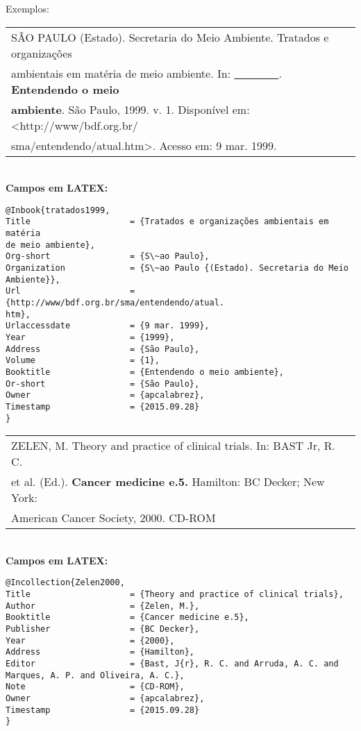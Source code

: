 	   	Exemplos: \\ 
	   	
	   	\begin{tabular}{|l|c|} \hline
	   		SÃO PAULO (Estado). Secretaria do Meio Ambiente. Tratados e organizações\\ ambientais em matéria de meio ambiente. In: \underline{\ \ \ \ \ \ \ \ }. \textbf{Entendendo o meio} \\\textbf{ambiente}. São Paulo, 1999. v. 1. Disponível em: <http://www/bdf.org.br/\\sma/entendendo/atual.htm>. Acesso em: 9 mar.
	   		1999.  \\\hline
	   	\end{tabular} \\ 
	   	
	   	\textbf{Campos em LATEX:} 
	   	
	   	\begin{verbatim}
@Inbook{tratados1999,
Title                    = {Tratados e organizações ambientais em matéria 
de meio ambiente},
Org-short                = {S\~ao Paulo},
Organization             = {S\~ao Paulo {(Estado). Secretaria do Meio 
Ambiente}},
Url                      = {http://www/bdf.org.br/sma/entendendo/atual.
htm},
Urlaccessdate            = {9 mar. 1999},
Year                     = {1999},
Address                  = {São Paulo},
Volume                   = {1},
Booktitle                = {Entendendo o meio ambiente},
Or-short                 = {São Paulo},
Owner                    = {apcalabrez},
Timestamp                = {2015.09.28}
}
	   	\end{verbatim}
	   	
\begin{tabular}{|l|c|} \hline
ZELEN, M. Theory and practice of clinical trials. In: BAST Jr, R. C. \\et al. (Ed.). \textbf{Cancer medicine e.5.} Hamilton: BC Decker; New York: \\American Cancer Society, 2000. CD-ROM  \\\hline
\end{tabular} \\ 
	   		
\textbf{Campos em LATEX:} 
	   		
	   		
\begin{verbatim}
@Incollection{Zelen2000,
Title                    = {Theory and practice of clinical trials},
Author                   = {Zelen, M.},
Booktitle                = {Cancer medicine e.5},
Publisher                = {BC Decker},
Year                     = {2000},
Address                  = {Hamilton},
Editor                   = {Bast, J{r}, R. C. and Arruda, A. C. and 
Marques, A. P. and Oliveira, A. C.},
Note                     = {CD-ROM},
Owner                    = {apcalabrez},
Timestamp                = {2015.09.28}
}
\end{verbatim}
	   		
